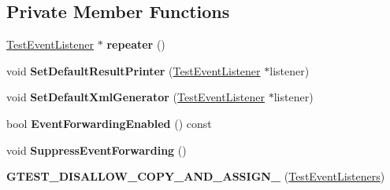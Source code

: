 \subsection*{Private Member Functions}
\begin{DoxyCompactItemize}
\item 
\mbox{\label{classtesting_1_1_test_event_listeners_ad28af964081553de465fbfc1c5a46650}} 
\mbox{\hyperlink{classtesting_1_1_test_event_listener}{Test\+Event\+Listener}} $\ast$ {\bfseries repeater} ()
\item 
\mbox{\label{classtesting_1_1_test_event_listeners_aeaab55da7c18c35fb12c27c18ff99955}} 
void {\bfseries Set\+Default\+Result\+Printer} (\mbox{\hyperlink{classtesting_1_1_test_event_listener}{Test\+Event\+Listener}} $\ast$listener)
\item 
\mbox{\label{classtesting_1_1_test_event_listeners_a36dbac47563ef8bb78cb467d11f5b4d9}} 
void {\bfseries Set\+Default\+Xml\+Generator} (\mbox{\hyperlink{classtesting_1_1_test_event_listener}{Test\+Event\+Listener}} $\ast$listener)
\item 
\mbox{\label{classtesting_1_1_test_event_listeners_aa1878baf16a50f30f6435fad3c68ef3f}} 
bool {\bfseries Event\+Forwarding\+Enabled} () const
\item 
\mbox{\label{classtesting_1_1_test_event_listeners_a7132550dc1c50bb3399a6d6d3fc9be3d}} 
void {\bfseries Suppress\+Event\+Forwarding} ()
\item 
\mbox{\label{classtesting_1_1_test_event_listeners_a31d12292abc277dedbb7dc7748a6a60e}} 
{\bfseries G\+T\+E\+S\+T\+\_\+\+D\+I\+S\+A\+L\+L\+O\+W\+\_\+\+C\+O\+P\+Y\+\_\+\+A\+N\+D\+\_\+\+A\+S\+S\+I\+G\+N\+\_\+} (\mbox{\hyperlink{classtesting_1_1_test_event_listeners}{Test\+Event\+Listeners}})
\end{DoxyCompactItemize}

